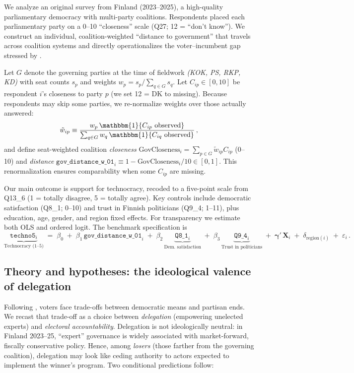 We analyze an original survey from Finland (2023–2025), a high-quality parliamentary democracy with multi-party coalitions. Respondents placed each parliamentary party on a 0–10 “closeness” scale (Q27; 12 = “don’t know”). We construct an individual, coalition-weighted “distance to government” that travels across coalition systems and directly operationalizes the voter–incumbent gap stressed by \citet{Svolik2020QJPS}.

Let $G$ denote the governing parties at the time of fieldwork \emph{(KOK, PS, RKP, KD)} with seat counts $s_p$ and weights $w_p = s_p/\sum_{q\in G}s_q$. Let $C_{ip}\in[0,10]$ be respondent $i$’s closeness to party $p$ (we set 12 = DK to missing). Because respondents may skip some parties, we re-normalize weights over those actually answered:
\[
\tilde w_{ip} \equiv 
\frac{w_p \,\mathbbm{1}\{C_{ip}\ \text{observed}\}}
{\sum_{q \in G} w_q \,\mathbbm{1}\{C_{iq}\ \text{observed}\}}\,,
\]
and define seat-weighted coalition \emph{closeness}
$\text{GovCloseness}_i=\sum_{p\in G}\tilde w_{ip}C_{ip}$ (0–10) and \emph{distance}
$\texttt{gov\_distance\_w\_01}_i\equiv 1-\text{GovCloseness}_i/10\in[0,1]$.
This renormalization ensures comparability when some $C_{ip}$ are missing.

Our main outcome is support for technocracy, recoded to a five-point scale from Q13\_6 (1 = totally disagree, 5 = totally agree). Key controls include democratic satisfaction (Q8\_1; 0–10) and trust in Finnish politicians (Q9\_4; 1–11), plus education, age, gender, and region fixed effects. For transparency we estimate both OLS and ordered logit. The benchmark specification is
\[
\underbrace{\texttt{techno5}_i}_{\text{Technocracy (1--5)}} \;=\;
\beta_0 \;+\;
\beta_1\,\texttt{gov\_distance\_w\_01}_i \;+\;
\beta_2\,\underbrace{\texttt{Q8\_1}_i}_{\text{Dem.\ satisfaction}} \;+\;
\beta_3\,\underbrace{\texttt{Q9\_4}_i}_{\text{Trust in politicians}} \;+\;
\boldsymbol{\gamma}'\,\mathbf{X}_i
\;+\; \delta_{\text{region}(i)} \;+\; \varepsilon_i\,.
\]

\subsection*{Theory and hypotheses: the ideological valence of delegation}

Following \citet{Svolik2020QJPS}, voters face trade-offs between democratic means and partisan ends. We recast that trade-off as a choice between \emph{delegation} (empowering unelected experts) and \emph{electoral accountability}. Delegation is not ideologically neutral: in Finland 2023–25, “expert” governance is widely associated with market-forward, fiscally conservative policy. Hence, among \emph{losers} (those farther from the governing coalition), delegation may look like ceding authority to actors expected to implement the winner’s program. Two conditional predictions follow:

